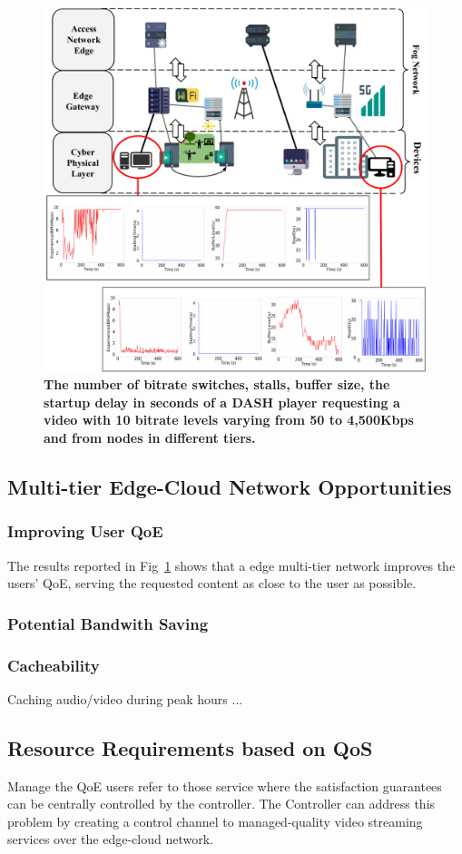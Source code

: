 \begin{figure}
    \centering
    \includegraphics[width=0.9\linewidth]{images/qoe-multi-level.pdf}
    \caption{\textbf{The number of bitrate switches, stalls, buffer size, the startup delay in seconds of a DASH player requesting a video with 10 bitrate levels varying from 50 to 4,500Kbps and from nodes in different tiers.}}
    \label{fig:impact-two-layers}
\end{figure}


\subsection{Multi-tier Edge-Cloud Network Opportunities}



\subsubsection{Improving User QoE}

The results reported in Fig~\ref{fig:impact-two-layers} shows that a edge multi-tier network improves the users' QoE, serving the requested content as close to the user as possible. 

\subsubsection{Potential Bandwith Saving}

\subsubsection{Cacheability}

Caching audio/video during peak hours ...

\subsection{Resource Requirements based on QoS}

Manage the QoE users refer to those service where the satisfaction guarantees can be centrally controlled by the controller. The Controller can address this problem by creating a control channel to managed-quality video streaming services over the edge-cloud network.

